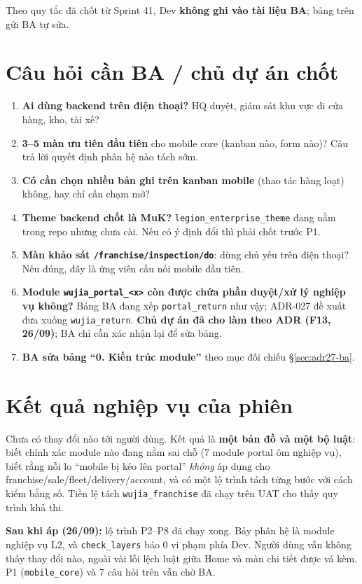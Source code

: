 Theo quy tắc đã chốt từ Sprint 41, Dev \textbf{không ghi vào tài liệu BA}; bảng trên gửi BA tự sửa.

\section{Câu hỏi cần BA / chủ dự án chốt}

\begin{enumerate}
\item \textbf{Ai dùng backend trên điện thoại?} HQ duyệt, giám sát khu vực đi cửa hàng, kho, tài xế?
\item \textbf{3--5 màn ưu tiên đầu tiên} cho mobile core (kanban nào, form nào)? Câu trả lời
  quyết định phân hệ nào tách sớm.
\item \textbf{Có cần chọn nhiều bản ghi trên kanban mobile} (thao tác hàng loạt) không, hay chỉ
  cần chạm mở?
\item \textbf{Theme backend chốt là MuK?} \texttt{legion\_enterprise\_theme} đang nằm trong repo
  nhưng chưa cài. Nếu có ý định đổi thì phải chốt trước P1.
\item \textbf{Màn khảo sát \texttt{/franchise/inspection/do}}: dùng chủ yếu trên điện thoại? Nếu
  đúng, đây là ứng viên cầu nối mobile đầu tiên.
\item \textbf{Module \texttt{wujia\_portal\_<x>} còn được chứa phần duyệt/xử lý nghiệp vụ không?}
  Bảng BA đang xếp \texttt{portal\_return} như vậy; ADR-027 đề xuất đưa xuống \texttt{wujia\_return}.
  \textbf{Chủ dự án đã cho làm theo ADR (F13, 26/09)}; BA chỉ cần xác nhận lại để sửa bảng.
\item \textbf{BA sửa bảng ``0. Kiến trúc module''} theo mục đối chiếu \S\ref{sec:adr27-ba}.
\end{enumerate}

\section{Kết quả nghiệp vụ của phiên}

Chưa có thay đổi nào tới người dùng. Kết quả là \textbf{một bản đồ và một bộ luật}: biết chính xác
module nào đang nằm sai chỗ (7 module portal ôm nghiệp vụ), biết rằng nỗi lo ``mobile bị kéo lên
portal'' \emph{không} áp dụng cho franchise/sale/fleet/delivery/account, và có một lộ trình tách
từng bước với cách kiểm bằng số. Tiền lệ tách \texttt{wujia\_franchise} đã chạy trên UAT cho thấy
quy trình khả thi.

\textbf{Sau khi áp (26/09):} lộ trình P2--P8 đã chạy xong. Bảy phân hệ là module nghiệp vụ L2, và
\texttt{check\_layers} báo 0 vi phạm phía Dev. Người dùng vẫn không thấy thay đổi nào, ngoài vài lỗi lệch luật giữa
Home và màn chi tiết được vá kèm. P1 (\texttt{mobile\_core}) và 7 câu hỏi trên vẫn chờ BA.
